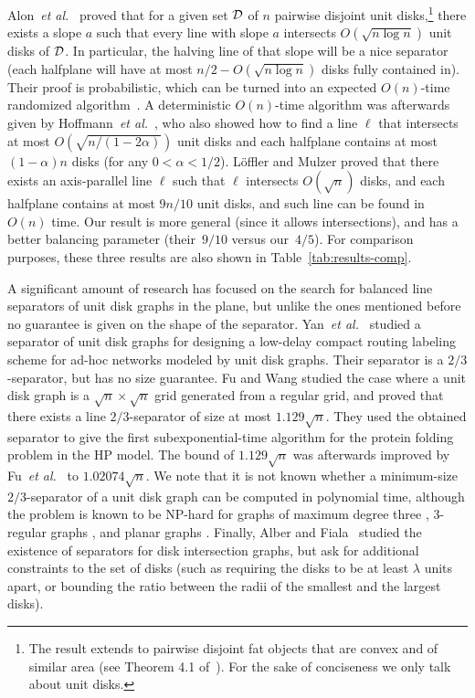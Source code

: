 \documentclass{llncs}
\newcommand{\etal}{\textit{et al.}}
\begin{document}
Alon~\etal~\cite{DBLP:journals/dcg/AlonKP89} 
proved that for a given set $\cal{D}$ of $n$ pairwise disjoint unit disks,\footnote{The result extends to pairwise disjoint fat objects that are convex and of similar area (see Theorem 4.1 of~\cite{DBLP:journals/dcg/AlonKP89}). For the sake of conciseness we only talk about unit disks.} there exists a slope $a$ such that 
every line with slope $a$ intersects $O(\sqrt{n \log n})$ unit disks
of $\cal{D}$. In particular, the halving line of that slope will be a nice separator (each halfplane will have at most $n/2-O(\sqrt{n \log n})$ disks fully contained in). Their proof is probabilistic, which can be turned into an expected $O(n)$-time randomized algorithm~\cite{DBLP:journals/jocg/LofflerM14}.
A deterministic $O(n)$-time algorithm was afterwards given by Hoffmann~\etal~\cite{DBLP:conf/esa/HoffmannKM14},
who also showed how to find a line $\ell$ that intersects at most $O(\sqrt{n/(1-2\alpha)})$ unit disks and 
each halfplane 
 contains at most $(1-\alpha)n$ disks
(for any $0 < \alpha < 1/2$). L\"offler and Mulzer \cite{DBLP:journals/jocg/LofflerM14}
proved that
there exists 
an axis-parallel line $\ell$ such that $\ell$ intersects $O(\sqrt{n})$ 
disks, and each halfplane
 contains at most $9n/10$ 
 unit disks, and such line can be found in $O(n)$ time.
Our result is more general (since it allows intersections), and has a better balancing parameter (their~$9/10$ versus our~$4/5$). 
For comparison purposes, these three results are also shown in Table~\ref{tab:results-comp}.


A significant amount of research has focused on the search for balanced line separators of unit disk graphs in the plane, but unlike the ones mentioned before no guarantee is given on the shape of the separator. Yan~\etal~\cite{DBLP:journals/comgeo/YanXD12} studied a separator
of unit disk graphs
for designing a low-delay compact routing labeling scheme for ad-hoc networks
modeled by unit disk graphs.
Their separator is a $2/3$-separator, but has no size guarantee.
Fu and Wang \cite{DBLP:journals/siamcomp/FuW07} studied the case where a 
unit disk graph is a $\sqrt{n}\times\sqrt{n}$ grid generated from a
regular grid, and proved that there exists a line $2/3$-separator of size at most $1.129\sqrt{n}$.
They used the obtained separator to give the first subexponential-time
algorithm for the protein folding problem in the HP model.
The bound of $1.129\sqrt{n}$ was afterwards improved by Fu~\etal~\cite{DBLP:journals/ijcga/FuOX08} to $1.02074\sqrt{n}$.
We note that it is not known whether a minimum-size $2/3$-separator
of a unit disk graph can be computed in polynomial time, although
the problem is known to be NP-hard for 
graphs of maximum degree three \cite{DBLP:journals/ipl/BuiJ92},
$3$-regular graphs \cite{DBLP:journals/computing/MullerW91}, 
and planar graphs \cite{DBLP:journals/jgaa/Fukuyama06}. Finally, Alber and Fiala~\cite{DBLP:journals/jal/AlberF04} studied the existence of separators for disk intersection graphs, but ask for additional constraints to the set of disks (such as requiring the disks to be at least $\lambda$ units apart, or bounding the ratio between the radii of the smallest and the largest disks).
\end{document}
